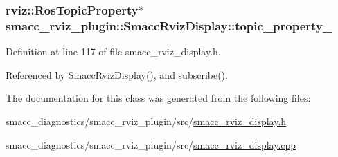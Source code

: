 \subsubsection[{\texorpdfstring{topic\+\_\+property\+\_\+}{topic_property_}}]{\setlength{\rightskip}{0pt plus 5cm}rviz\+::\+Ros\+Topic\+Property$\ast$ smacc\+\_\+rviz\+\_\+plugin\+::\+Smacc\+Rviz\+Display\+::topic\+\_\+property\+\_\+\hspace{0.3cm}{\ttfamily [private]}}\hypertarget{classsmacc__rviz__plugin_1_1SmaccRvizDisplay_ad81e5239e1343b2ba01ee16d1f010932}{}\label{classsmacc__rviz__plugin_1_1SmaccRvizDisplay_ad81e5239e1343b2ba01ee16d1f010932}


Definition at line 117 of file smacc\+\_\+rviz\+\_\+display.\+h.



Referenced by Smacc\+Rviz\+Display(), and subscribe().



The documentation for this class was generated from the following files\+:\begin{DoxyCompactItemize}
\item 
smacc\+\_\+diagnostics/smacc\+\_\+rviz\+\_\+plugin/src/\hyperlink{smacc__rviz__display_8h}{smacc\+\_\+rviz\+\_\+display.\+h}\item 
smacc\+\_\+diagnostics/smacc\+\_\+rviz\+\_\+plugin/src/\hyperlink{smacc__rviz__display_8cpp}{smacc\+\_\+rviz\+\_\+display.\+cpp}\end{DoxyCompactItemize}
